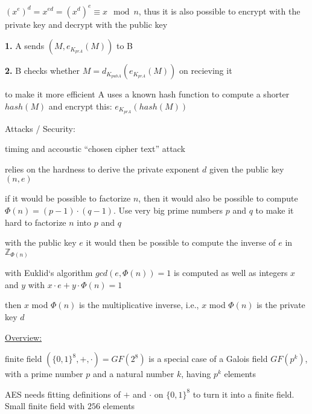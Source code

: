 \documentclass[landscape, a4paper]{article}
\begin{document}
\begin{minipage}[t]{0.2\linewidth}
\begin{betterlist}
\begin{betterlist}
			\item $(x^e)^d = x^{ed} = (x^d)^e \equiv x \mod n$, thus it is also possible to encrypt with the private key and decrypt with the public key
			\item[\color{PrimaryColor}\textbf{1.} ] A sends $(M, e_{K_{prA}}(M))$ to B
			\item[\color{PrimaryColor}\textbf{2.} ] B checks whether $M = d_{K_{pubA}}(e_{K_{prA}}(M))$ on recieving it
			\item to make it more efficient A uses a known hash function to compute a shorter $hash(M)$ and encrypt this: $e_{K_{prA}}(hash(M))$
		\end{betterlist}
		\item \alert{Attacks / Security:}
		\begin{betterlist}
			\item timing and accoustic \enquote{chosen cipher text} attack
			\item relies on the hardness to derive the \alert{private exponent} $d$ given the public key $(n, e)$
			\item if it would be possible to factorize $n$, then it would also be possible to compute $\Phi(n)= (p - 1) \cdot (q - 1)$. Use very big prime numbers $p$ and $q$ to make it hard to factorize $n$ into $p$ and $q$
			\item with the public key $e$ it would then be possible to compute the inverse of $e$ in $\mathbb{Z}_{\Phi(n)}$
			\begin{betterlist}
				\item with Euklid‘s algorithm $gcd(e, \Phi(n) ) = 1$ is computed as well as integers $x$ and $y$ with $x \cdot e + y \cdot \Phi(n) = 1$
				\item then $x$ mod $\Phi(n)$ is the multiplicative inverse, i.e., $x$ mod $\Phi(n)$ is the private key $d$
			\end{betterlist}
		\end{betterlist}
	\end{betterlist}
	\fbox{Mathematical background}
	\begin{betterlist}
		\item \underline{Overview:}
		\begin{betterlist}
			\item \alert{finite field} $(\{0, 1\}^8, +, \cdot)=GF(2^8)$ is a special case of a Galois field $GF(p^k)$, with a prime number $p$ and a natural number $k$, having $p^k$ elements
			\begin{betterlist}
				\item AES needs fitting definitions of $+$ and $\cdot$ on $\{0, 1\}^8$ to turn it into a \alert{finite field}. Small finite field with $256$ elements

\end{betterlist}
\end{betterlist}
\end{betterlist}
\end{minipage}
\end{document}
